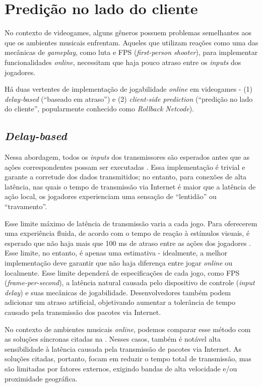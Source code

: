 \section{Predição no lado do cliente}
\label{sec:client_side_prediction}

No contexto de videogames, alguns gêneros possuem problemas semelhantes aos que os ambientes musicais enfrentam. Aqueles que utilizam reações como uma das mecânicas de \textit{gameplay}, como luta e FPS (\textit{first-person shooter}), para implementar funcionalidades \textit{online}, necessitam que haja pouco atraso entre os \textit{inputs} dos jogadores.

Há duas vertentes de implementação de jogabilidade \textit{online} em videogames - (1) \textit{delay-based} (``baseado em atraso'')\cite{netcode} e (2) \textit{client-side prediction} (``predição no lado do cliente'', popularmente conhecido como \textit{Rollback Netcode})\cite{client-side-prediction}.

\subsection{\textit{Delay-based}}

Nessa abordagem, todos os \textit{inputs} dos transmissores são esperados antes que as ações correspondentes possam ser executadas \cite{netcode}. Essa implementação é trivial e garante a corretude dos dados transmitidos; no entanto, para conexões de alta latência, nas quais o tempo de transmissão via Internet é maior que a latência de ação local, os jogadores experienciam uma sensação de ``lentidão'' ou ``travamento''.

Esse limite máximo de latência de transmissão varia a cada jogo. Para oferecerem uma experiência fluida, de acordo com o tempo de reação à estímulos visuais, é esperado que não haja mais que 100 ms de atraso entre as ações dos jogadores \cite{pubnub}. Esse limite, no entanto, é apenas uma estimativa - idealmente, a melhor implementação deve garantir que não haja diferença entre jogar \textit{online} ou localmente. Esse limite dependerá de especificações de cada jogo, como FPS (\textit{frame-per-second}), a latência natural causada pelo dispositivo de controle (\textit{input delay}) e suas mecânicas de jogabilidade. Desenvolvedores também podem adicionar um atraso artificial, objetivando aumentar a tolerância de tempo causado pela transmissão dos pacotes via Internet.

No contexto de ambientes musicais \textit{online}, podemos comparar esse método com as soluções síncronas citadas na . Nesses casos, também é notável alta sensibilidade à latência causada pela transmissão de pacotes via Internet. As soluções citadas, portanto, focam em reduzir o tempo total de transmissão, mas são limitadas por fatores externos, exigindo bandas de alta velocidade e/ou proximidade geográfica.

